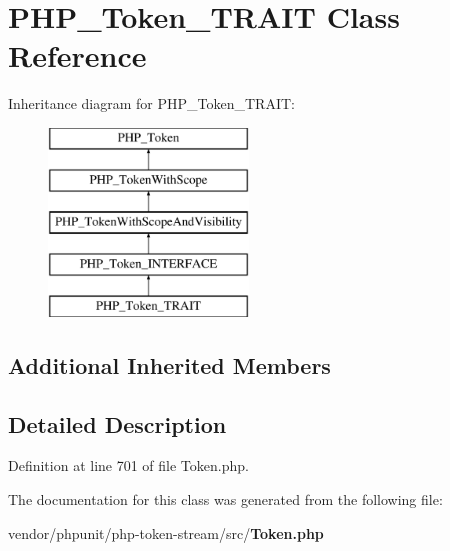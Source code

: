 \section{P\+H\+P\+\_\+\+Token\+\_\+\+T\+R\+A\+I\+T Class Reference}
\label{class_p_h_p___token___t_r_a_i_t}
Inheritance diagram for P\+H\+P\+\_\+\+Token\+\_\+\+T\+R\+A\+I\+T\+:\begin{figure}[H]
\begin{center}
\leavevmode
\includegraphics[height=5.000000cm]{class_p_h_p___token___t_r_a_i_t}
\end{center}
\end{figure}
\subsection*{Additional Inherited Members}


\subsection{Detailed Description}


Definition at line 701 of file Token.\+php.



The documentation for this class was generated from the following file\+:\begin{DoxyCompactItemize}
\item 
vendor/phpunit/php-\/token-\/stream/src/{\bf Token.\+php}\end{DoxyCompactItemize}
